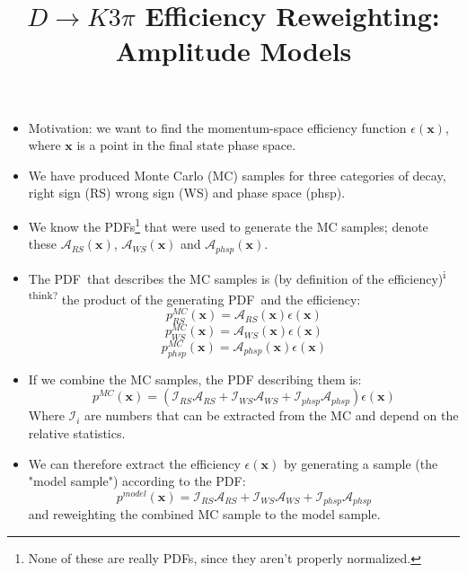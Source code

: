 \documentclass{article}
\title{$D\rightarrow K3\pi$ Efficiency Reweighting: Amplitude Models}
\begin{document}
\maketitle
\begin{itemize}
    \item Motivation: we want to find the momentum-space efficiency function $\epsilon(\mathbf{x})$,
          where $\mathbf{x}$ is a point in the final state phase space.
    \item We have produced Monte Carlo (MC) samples for three categories of decay, right sign (RS) wrong sign (WS) and phase space (phsp).
    \item We know the PDFs\footnote[1]{None of these are really PDFs, since they aren't properly normalized.} that were used to generate the MC samples; denote these
          $\mathcal{A}_{RS}(\mathbf{x})$, $\mathcal{A}_{WS}(\mathbf{x})$ and $\mathcal{A}_{phsp}(\mathbf{x})$.
    \item The PDF\footnotemark\ that describes the MC samples is (by definition of the efficiency)\textsuperscript{i think?} the product of the generating PDF\footnotemark\ and the efficiency:
          \begin{equation*}
              p^{MC}_{RS}(\mathbf{x}) = \mathcal{A}_{RS}(\mathbf{x})\epsilon(\mathbf{x})
          \end{equation*}
          \begin{equation}
              p^{MC}_{WS}(\mathbf{x}) = \mathcal{A}_{WS}(\mathbf{x})\epsilon(\mathbf{x})
          \end{equation}
          \begin{equation*}
              p^{MC}_{phsp}(\mathbf{x}) = \mathcal{A}_{phsp}(\mathbf{x})\epsilon(\mathbf{x})
          \end{equation*}
    \item If we combine the MC samples, the PDF describing them is:
          \begin{equation}
              p^{MC}(\mathbf{x}) = (\mathcal{I}_{RS}\mathcal{A}_{RS}
              + \mathcal{I}_{WS}\mathcal{A}_{WS}
              + \mathcal{I}_{phsp}\mathcal{A}_{phsp})\epsilon(\mathbf{x})
          \end{equation}
          Where $\mathcal{I}_{i}$ are numbers that can be extracted from the MC and depend on the relative statistics.
    \item We can therefore extract the efficiency $\epsilon(\mathbf{x})$ by generating a sample (the "model sample") according to the PDF\footnotemark:
          \begin{equation}
              p^{model}(\mathbf{x}) = \mathcal{I}_{RS}\mathcal{A}_{RS}
              + \mathcal{I}_{WS}\mathcal{A}_{WS}
              + \mathcal{I}_{phsp}\mathcal{A}_{phsp}
          \end{equation}
          and reweighting the combined MC sample to the model sample.
\end{itemize}
\end{document}
